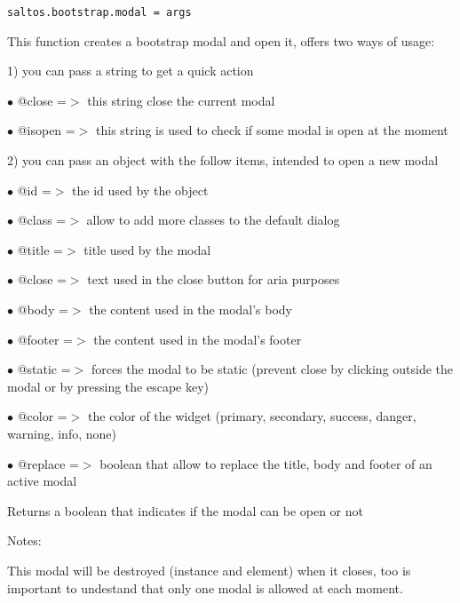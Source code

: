 \documentclass[a4paper]{book}
\begin{document}
\begin{lstlisting}
saltos.bootstrap.modal = args
\end{lstlisting}

This function creates a bootstrap modal and open it, offers two ways of usage:

1) you can pass a string to get a quick action

\begin{compactitem}
\item[\color{myblue}$\bullet$] @close   =$>$ this string close the current modal
\item[\color{myblue}$\bullet$] @isopen  =$>$ this string is used to check if some modal is open at the moment
\end{compactitem}

2) you can pass an object with the follow items, intended to open a new modal

\begin{compactitem}
\item[\color{myblue}$\bullet$] @id      =$>$ the id used by the object
\item[\color{myblue}$\bullet$] @class   =$>$ allow to add more classes to the default dialog
\item[\color{myblue}$\bullet$] @title   =$>$ title used by the modal
\item[\color{myblue}$\bullet$] @close   =$>$ text used in the close button for aria purposes
\item[\color{myblue}$\bullet$] @body    =$>$ the content used in the modal's body
\item[\color{myblue}$\bullet$] @footer  =$>$ the content used in the modal's footer
\item[\color{myblue}$\bullet$] @static  =$>$ forces the modal to be static (prevent close by clicking outside the modal or
            by pressing the escape key)
\item[\color{myblue}$\bullet$] @color   =$>$ the color of the widget (primary, secondary, success, danger, warning, info, none)
\item[\color{myblue}$\bullet$] @replace =$>$ boolean that allow to replace the title, body and footer of an active modal
\end{compactitem}

Returns a boolean that indicates if the modal can be open or not

Notes:

This modal will be destroyed (instance and element) when it closes, too is important
to undestand that only one modal is allowed at each moment.
\end{document}
